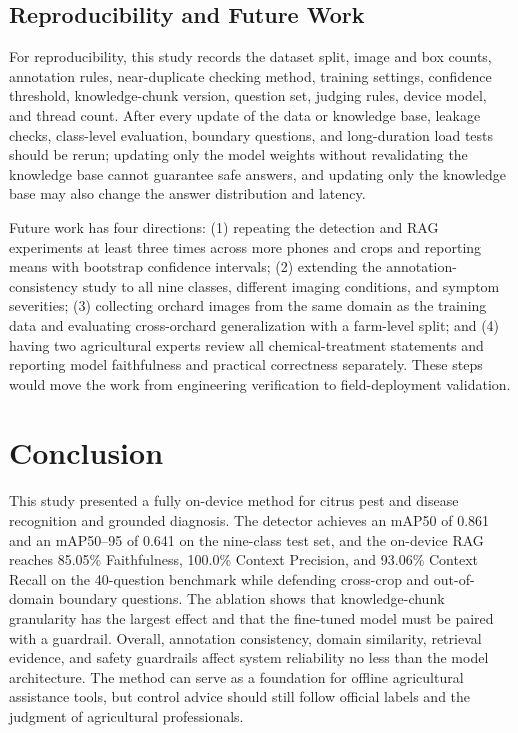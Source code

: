 \documentclass[10pt,twocolumn,a4paper]{article}
\begin{document}
\subsection{Reproducibility and Future Work}
For reproducibility, this study records the dataset split, image and box counts, annotation rules, near-duplicate checking method, training settings, confidence threshold, knowledge-chunk version, question set, judging rules, device model, and thread count. After every update of the data or knowledge base, leakage checks, class-level evaluation, boundary questions, and long-duration load tests should be rerun; updating only the model weights without revalidating the knowledge base cannot guarantee safe answers, and updating only the knowledge base may also change the answer distribution and latency.

Future work has four directions: (1) repeating the detection and RAG experiments at least three times across more phones and crops and reporting means with bootstrap confidence intervals; (2) extending the annotation-consistency study to all nine classes, different imaging conditions, and symptom severities; (3) collecting orchard images from the same domain as the training data and evaluating cross-orchard generalization with a farm-level split; and (4) having two agricultural experts review all chemical-treatment statements and reporting model faithfulness and practical correctness separately. These steps would move the work from engineering verification to field-deployment validation.

\section{Conclusion}
This study presented a fully on-device method for citrus pest and disease recognition and grounded diagnosis. The detector achieves an mAP50 of 0.861 and an mAP50–95 of 0.641 on the nine-class test set, and the on-device RAG reaches 85.05\% Faithfulness, 100.0\% Context Precision, and 93.06\% Context Recall on the 40-question benchmark while defending cross-crop and out-of-domain boundary questions. The ablation shows that knowledge-chunk granularity has the largest effect and that the fine-tuned model must be paired with a guardrail. Overall, annotation consistency, domain similarity, retrieval evidence, and safety guardrails affect system reliability no less than the model architecture. The method can serve as a foundation for offline agricultural assistance tools, but control advice should still follow official labels and the judgment of agricultural professionals.
\end{document}
